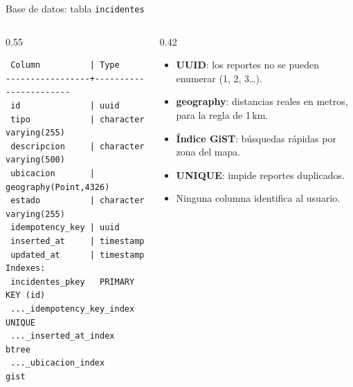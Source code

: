 \documentclass[aspectratio=169,10pt]{beamer}
\begin{document}
\begin{frame}[fragile]{Base de datos: tabla \texttt{incidentes}}
  \begin{columns}[T]
    \begin{column}{0.55\textwidth}
\begin{lstlisting}
 Column          | Type
-----------------+-----------------------
 id              | uuid
 tipo            | character varying(255)
 descripcion     | character varying(500)
 ubicacion       | geography(Point,4326)
 estado          | character varying(255)
 idempotency_key | uuid
 inserted_at     | timestamp
 updated_at      | timestamp
Indexes:
 incidentes_pkey   PRIMARY KEY (id)
 ..._idempotency_key_index  UNIQUE
 ..._inserted_at_index      btree
 ..._ubicacion_index        gist
\end{lstlisting}
    \end{column}
    \begin{column}{0.42\textwidth}
      \small
      \begin{itemize}
        \item \textbf{UUID}: los reportes no se pueden enumerar (1, 2, 3\ldots).
        \item \textbf{geography}: distancias reales en metros, para la regla de 1\,km.
        \item \textbf{Índice GiST}: búsquedas rápidas por zona del mapa.
        \item \textbf{UNIQUE}: impide reportes duplicados.
        \item \alert{Ninguna columna identifica al usuario.}
      \end{itemize}
    \end{column}
  \end{columns}
\end{frame}
\end{document}
